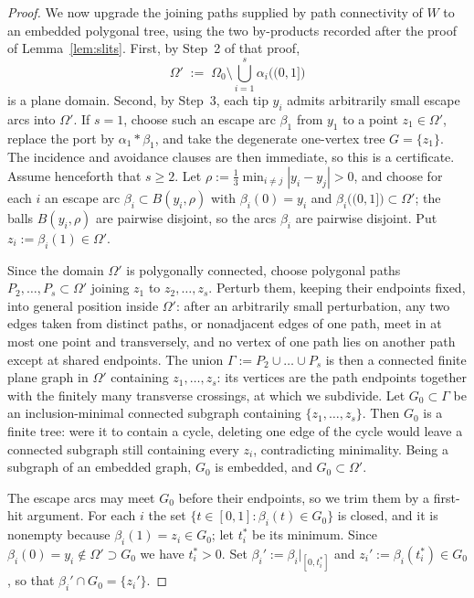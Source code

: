 \documentclass[11pt,reqno]{amsart}
\theoremstyle{definition}
\theoremstyle{remark}
\begin{document}
\begin{proof}
We now upgrade the joining paths supplied by path connectivity of $W$ to an embedded
polygonal tree, using the two by-products recorded after the proof of
Lemma~\ref{lem:slits}. First, by Step~2 of that proof,
\[
\Omega'\;:=\;\Omega_0\setminus\bigcup_{i=1}^{s}\alpha_i\bigl((0,1]\bigr)
\]
is a plane domain. Second, by Step~3, each tip $y_i$ admits arbitrarily small escape
arcs into $\Omega'$. If $s=1$, choose such an escape arc $\beta_1$ from
$y_1$ to a point $z_1\in\Omega'$, replace the port by
$\alpha_1*\beta_1$, and take the degenerate one-vertex tree
$G=\{z_1\}$.  The incidence and avoidance clauses are then immediate, so
this is a certificate.  Assume henceforth that $s\ge2$. Let
$\rho:=\tfrac13\min_{i\neq j}|y_i-y_j|>0$, and choose for each
$i$ an escape arc $\beta_i\subset B(y_i,\rho)$ with $\beta_i(0)=y_i$ and
$\beta_i\bigl((0,1]\bigr)\subset\Omega'$; the balls $B(y_i,\rho)$ are pairwise
disjoint, so the arcs $\beta_i$ are pairwise disjoint. Put $z_i:=\beta_i(1)\in\Omega'$.

Since the domain $\Omega'$ is polygonally connected, choose polygonal paths
$P_2,\dots,P_s\subset\Omega'$ joining $z_1$ to $z_2,\dots,z_s$. Perturb them, keeping
their endpoints fixed, into general position inside $\Omega'$: after an arbitrarily
small perturbation, any two edges taken from distinct paths, or nonadjacent edges of one
path, meet in at most one point and transversely, and no vertex of one path lies on
another path except at shared endpoints. The union $\Gamma:=P_2\cup\dots\cup P_s$ is
then a connected finite plane graph in $\Omega'$ containing $z_1,\dots,z_s$: its
vertices are the path endpoints together with the finitely many transverse crossings, at
which we subdivide. Let $G_0\subset\Gamma$ be an inclusion-minimal connected subgraph
containing $\{z_1,\dots,z_s\}$. Then $G_0$ is a finite tree: were it to contain a
cycle, deleting one edge of the cycle would leave a connected subgraph still containing
every $z_i$, contradicting minimality. Being a subgraph of an embedded graph, $G_0$ is
embedded, and $G_0\subset\Omega'$.

The escape arcs may meet $G_0$ before their endpoints, so we trim them by a first-hit
argument. For each $i$ the set $\{t\in[0,1]:\beta_i(t)\in G_0\}$ is closed, and it is
nonempty because $\beta_i(1)=z_i\in G_0$; let $t_i^{*}$ be its minimum. Since
$\beta_i(0)=y_i\notin\Omega'\supset G_0$ we have $t_i^{*}>0$. Set
$\beta_i':=\beta_i|_{[0,t_i^{*}]}$ and $z_i':=\beta_i(t_i^{*})\in G_0$, so that
$\beta_i'\cap G_0=\{z_i'\}$.


\end{proof}
\end{document}
